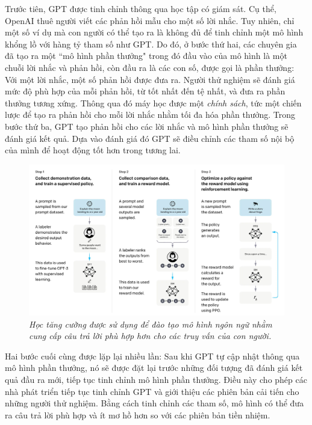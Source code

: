 \begin{multicols}{2}
	Trước tiên, GPT được tinh chỉnh thông qua học tập có giám sát. Cụ thể, OpenAI thuê người viết các phản hồi mẫu cho một số lời nhắc. Tuy nhiên, chỉ một số ví dụ mà con người có thể tạo ra là không đủ để tinh chỉnh một mô hình khổng lồ với hàng tỷ tham số như GPT. Do đó, ở bước thứ hai, các chuyên gia đã tạo ra một ``mô hình phần thưởng" trong đó đầu vào của mô hình là một chuỗi lời nhắc và phản hồi, còn đầu ra là các con số, được gọi là phần thưởng: Với một lời nhắc, một số phản hồi được đưa ra. Người thử nghiệm sẽ đánh giá mức độ phù hợp của mỗi phản hồi, từ tốt nhất đến tệ nhất, và đưa ra phần thưởng tương xứng. Thông qua đó máy học được một \textit{chính sách}, tức một chiến lược để tạo ra phản hồi cho mỗi lời nhắc nhằm tối đa hóa phần thưởng. Trong bước thứ ba, GPT tạo phản hồi cho các lời nhắc và mô hình phần thưởng sẽ đánh giá kết quả. Dựa vào đánh giá đó GPT sẽ điều chỉnh các tham số nội bộ của mình để hoạt động tốt hơn trong tương lai.
	\begin{figure}[H]
		\vspace*{-5pt}
		\centering
		\captionsetup{labelformat= empty, justification=centering}
		\includegraphics[width= 1\linewidth]{ChatGPT_Human_Feedback.jpeg}
		\caption{\small\textit{\color{timhieukhoahoc}Học tăng cường được sử dụng để đào tạo mô hình ngôn ngữ nhằm cung cấp câu trả lời phù hợp hơn cho các truy vấn của con người.}}
		\vspace*{-10pt}
	\end{figure}
	Hai bước cuối cùng được lặp lại nhiều lần: Sau khi GPT tự cập nhật thông qua mô hình phần thưởng, nó sẽ được đặt lại trước những đối tượng đã đánh giá kết quả đầu ra mới, tiếp tục tinh chỉnh mô hình phần thưởng. Điều này cho phép các nhà phát triển tiếp tục tinh chỉnh GPT và giới thiệu các phiên bản cải tiến cho những người thử nghiệm. Bằng cách tinh chỉnh các tham số, mô hình có thể đưa ra câu trả lời phù hợp và ít mơ hồ hơn so với các phiên bản tiền nhiệm. 

\end{multicols}
